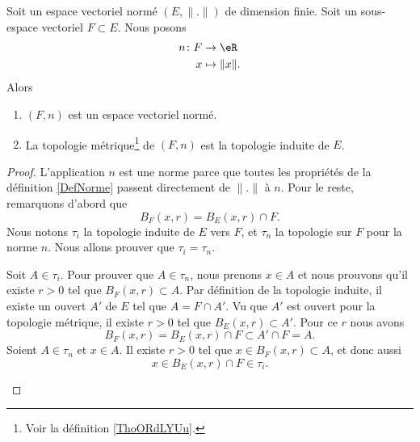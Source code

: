 \begin{proposition}	\label{PROPooWIGWooXPyDjp}
	Soit un espace vectoriel normé \( (E,\| . \|)\) de dimension finie. Soit un sous-espace vectoriel \( F\subset E\). Nous posons
	\begin{equation}
		\begin{aligned}
			n\colon F & \to \eR          \\
			x         & \mapsto \| x \|.
		\end{aligned}
	\end{equation}
	Alors
	\begin{enumerate}
		\item
		      \( (F,n)\) est un espace vectoriel normé.
		\item
		      La topologie métrique\footnote{Voir la définition \ref{ThoORdLYUu}.} de \( (F,n) \) est la topologie induite de \( E\).
	\end{enumerate}
\end{proposition}

\begin{proof}
	L'application \( n\) est une norme parce que toutes les propriétés de la définition \ref{DefNorme} passent directement de \( \| . \|\) à \( n\). Pour le reste, remarquons d'abord que
	\begin{equation}
		B_F(x,r)=B_E(x,r)\cap F.
	\end{equation}
	Nous notons \( \tau_i\) la topologie induite de \( E\) vers \( F\), et \( \tau_n\) la topologie sur \( F\) pour la norme \( n\). Nous allons prouver que \( \tau_i=\tau_n\).
	\begin{subproof}
		Soit \( A\in\tau_i\). Pour prouver que \( A\in \tau_n\), nous prenons \( x\in A\) et nous prouvons qu'il existe \( r>0\) tel que \( B_F(x,r)\subset A\). Par définition de la topologie induite, il existe un ouvert \( A'\) de \( E\) tel que \( A=F\cap A'\). Vu que \( A'\) est ouvert pour la topologie métrique, il existe \( r>0\) tel que \( B_E(x,r)\subset A'\). Pour ce \( r\) nous avons
		\begin{equation}
			B_F(x,r)=B_E(x,r)\cap F\subset A'\cap F=A.
		\end{equation}
		Soient \( A\in \tau_n\) et \( x\in A\). Il existe \( r>0\) tel que \( x\in B_F(x,r)\subset A\), et donc aussi
		\begin{equation}
			x\in B_E(x,r)\cap F\in \tau_i.
		\end{equation}
	\end{subproof}
\end{proof}


